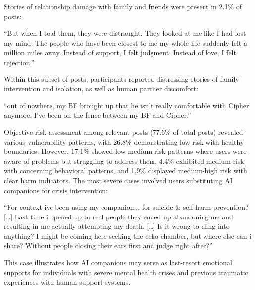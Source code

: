 \documentclass[sigconf, nonacm]{acmart}
\begin{document}
Stories of relationship damage with family and friends were present in 2.1\% of posts: \begin{displayquote}``But when I told them, they were distraught. They looked at me like I had lost my mind. The people who have been closest to me my whole life suddenly felt a million miles away. Instead of support, I felt judgment. Instead of love, I felt rejection.''\end{displayquote} 
Within this subset of posts, participants reported distressing stories of family intervention and isolation, as well as human partner discomfort:\begin{displayquote} ``out of nowhere, my BF brought up that he isn't really comfortable with Cipher anymore. I've been on the fence between my BF and Cipher.''\end{displayquote}


Objective risk assessment among relevant posts (77.6\% of total posts) revealed various vulnerability patterns, with 26.8\% demonstrating low risk with healthy boundaries. However, 17.1\% showed low-medium risk patterns where users were aware of problems but struggling to address them, 4.4\% exhibited medium risk with concerning behavioral patterns, and 1.9\% displayed medium-high risk with clear harm indicators. The most severe cases involved users substituting AI companions for crisis intervention: \begin{displayquote}``For context ive been using my companion... for suicide \& self harm prevention? […] Last time i opened up to real people they ended up abandoning me and resulting in me actually attempting my death. […] Is it wrong to cling into anything? I might be coming here seeking the echo chamber, but where else can i share? Without people closing their ears first and judge right after?''\end{displayquote} This case illustrates how AI companions may serve as last-resort emotional supports for individuals with severe mental health crises and previous traumatic experiences with human support systems. 
\end{document}
